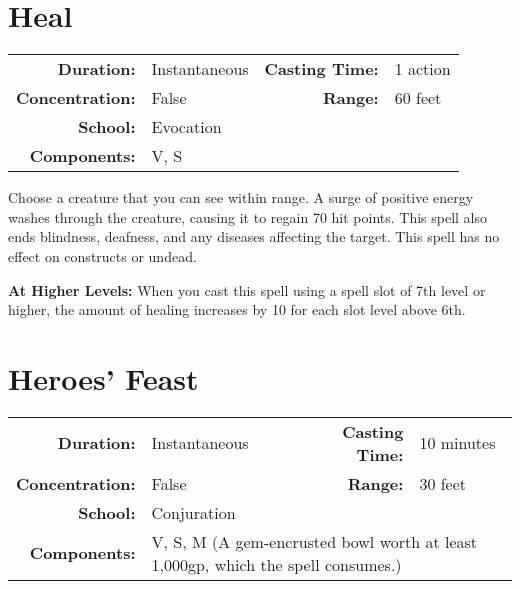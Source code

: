 \documentclass[a5paper, 12pt]{memoir}
\begin{document}
\newpage
\section*{Heal}

{
\small\centering\vspace{-6pt}
\begin{tabular}{rlrl}
\toprule

\textbf{Duration:} & Instantaneous &
\textbf{Casting Time:} & 1 action \\
\textbf{Concentration:} & False &
\textbf{Range:} & 60 feet \\
\textbf{School:} & Evocation \\
\textbf{Components:} & \multicolumn{3}{p{0.7\textwidth}}{V, S}\\

\bottomrule
\end{tabular}
}

\vspace{1\baselineskip}\noindent Choose a creature that you can see within range. A surge of positive energy washes through the creature, causing it to regain 70 hit points. This spell also ends blindness, deafness, and any diseases affecting the target. This spell has no effect on constructs or undead.

\vspace{8pt} \noindent\textbf{At Higher Levels:} When you cast this spell using a spell slot of 7th level or higher, the amount of healing increases by 10 for each slot level above 6th.
\newpage
\section*{Heroes' Feast}

{
\small\centering\vspace{-6pt}
\begin{tabular}{rlrl}
\toprule

\textbf{Duration:} & Instantaneous &
\textbf{Casting Time:} & 10 minutes \\
\textbf{Concentration:} & False &
\textbf{Range:} & 30 feet \\
\textbf{School:} & Conjuration \\
\textbf{Components:} & \multicolumn{3}{p{0.7\textwidth}}{V, S, M (A gem-encrusted bowl worth at least 1,000gp, which the spell consumes.)}\\

\bottomrule
\end{tabular}
}
\end{document}
